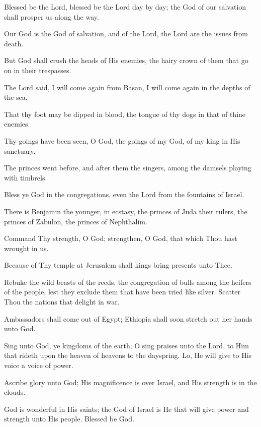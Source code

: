 Blessed be the Lord, blessed be the Lord day by day; the God of our salvation shall prosper us along the way.

Our God is the God of salvation, and of the Lord, the Lord are the issues from death.

But God shall crush the heads of His enemies, the hairy crown of them that go on in their trespasses.

The Lord said, I will come again from Basan, I will come again in the depths of the sea,

That thy foot may be dipped in blood, the tongue of thy dogs in that of thine enemies.

Thy goings have been seen, O God, the goings of my God, of my king in His sanctuary.

The princes went before, and after them the singers, among the damsels playing with timbrels.

Bless ye God in the congregations, even the Lord from the fountains of Israel.

There is Benjamin the younger, in ecstasy, the princes of Juda their rulers, the princes of Zabulon, the princes of Nephthalim.

Command Thy strength, O God; strengthen, O God, that
which Thou hast wrought in us.

Because of Thy temple at Jerusalem shall kings bring presents unto Thee.

Rebuke the wild beasts of the reeds, the congregation of bulls among the heifers of the people, lest they exclude them that have been tried like silver. Scatter Thou the nations that delight in war.

Ambassadors shall come out of Egypt; Ethiopia shall soon stretch out her hands unto God.

Sing unto God, ye kingdoms of the earth; O sing praises unto the Lord, to Him that rideth upon the heaven of heavens to the dayspring. Lo, He will give to His voice a voice of power.

Ascribe glory unto God; His magnificence is over Israel, and His strength is in the clouds.

God is wonderful in His saints; the God of Israel is He that will give power and strength unto His people. Blessed be God.
